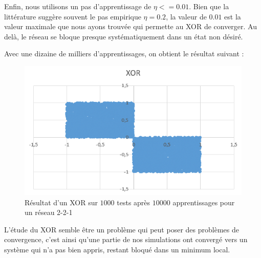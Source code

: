Enfin, nous utilisons un pas d'apprentissage de $\eta <= 0.01$. Bien que la littérature suggère souvent le pas empirique $\eta = 0.2$, la valeur de $0.01$ est la valeur maximale que nous ayons trouvée qui permette au XOR de converger. Au delà, le réseau se bloque presque systématiquement dans un état non désiré.

Avec une dizaine de milliers d'apprentissages, on obtient le résultat suivant : 

\begin{figure}[h!]
  \centering
  \includegraphics[scale=0.5]{images/resultat_xor.png}
  \caption{Résultat d'un XOR sur $1000$ tests après $10000$ apprentissages pour un réseau 2-2-1}
\end{figure}

L'étude du XOR semble être un problème qui peut poser des problèmes de convergence, c'est ainsi qu'une partie de nos simulations ont convergé vers un système qui n'a pas bien appris, restant bloqué dans un minimum local.